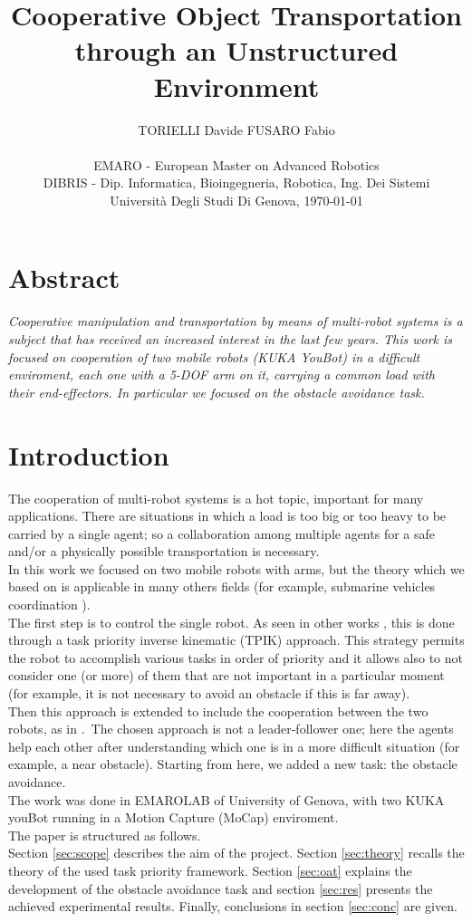 \documentclass[a4paper, 12pt, notitlepage]{article}
\date{}
\title{\Huge\textbf{Cooperative Object Transportation \\through an Unstructured Environment}}
\author{TORIELLI Davide \quad FUSARO Fabio \\\\
	\small EMARO - European Master on Advanced Robotics\\
	\small DIBRIS - Dip. Informatica, Bioingegneria, Robotica, Ing. Dei Sistemi\\
	\small Università Degli Studi Di Genova, \today}
\begin{document}
	\maketitle
	
	\begin{multicols}{2}
		\section*{Abstract}
		\textit{\hspace{7px}Cooperative manipulation and transportation 
		by means of multi-robot systems is a subject that has
		received an increased interest in the last few years. This work is focused on cooperation of two mobile robots (KUKA YouBot) in a difficult enviroment, each one with a 5-DOF arm on it, carrying a common load with their end-effectors. In particular we focused on the obstacle avoidance task.}
	
		\section{Introduction}
		\hspace{7px}The cooperation of multi-robot systems is a hot topic, important for many applications. There are situations in which a load is too big or too heavy to be carried by a single agent; so a collaboration among multiple agents for a safe and/or a physically possible transportation is necessary.\\
		In this work we focused on two mobile robots with arms, but the theory which we based on is applicable in many others fields (for example, submarine vehicles coordination \cite{subvec}).\\
		\hspace*{7px}The first step is to control the single robot. As seen in other works \cite{tpik}, this is done through a task priority inverse kinematic (TPIK) approach. This strategy permits the robot to accomplish various tasks in order of priority and it allows also to not consider one (or more) of them that are not important in a particular moment (for example, it is not necessary to avoid an obstacle if this is far away). \\
		Then this approach is extended to include the cooperation between the two robots, as in \cite{coopcasa} \cite{wander}.\ 
		The chosen approach is not a leader-follower one; here the agents help each other after understanding which one is in a more difficult situation (for example, a near obstacle). 
		Starting from here, we added a new task: the obstacle avoidance.\\
		The work was done in EMAROLAB of University of Genova, with two KUKA youBot running in a Motion Capture (MoCap) enviroment.\\
		\hspace*{7px}The paper is structured as follows. \\Section \ref{sec:scope} describes the aim of the project. Section \ref{sec:theory} recalls the theory of the used task priority framework. Section \ref{sec:oat} explains the development of the obstacle avoidance task and section \ref{sec:res} presents the  achieved experimental results. Finally, conclusions in section \ref{sec:conc} are given.
		

\end{multicols}
\end{document}
